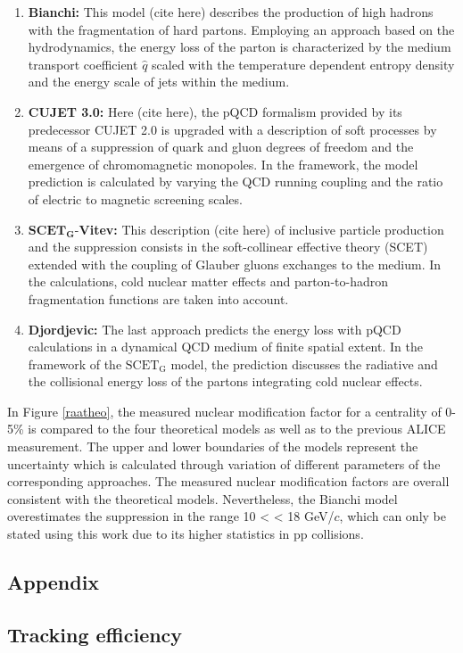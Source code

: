 \documentclass[12pt,a4paper]{report}
\begin{document}
\begin{enumerate}
\item \textbf{Bianchi:} This model (cite here) describes the production of high \pt hadrons with the fragmentation of hard partons. Employing an approach based on the hydrodynamics, the energy loss of the parton is characterized by the medium transport coefficient $\hat q$ scaled with the temperature dependent entropy density and the energy scale of jets within the medium.
\item \textbf{CUJET 3.0:} Here (cite here), the pQCD formalism provided by its predecessor CUJET 2.0 is upgraded with a description of soft processes by means of a suppression of quark and gluon degrees of freedom and the emergence of chromomagnetic monopoles. In the framework, the model prediction is calculated by varying the QCD running coupling and the ratio of electric to magnetic screening scales.
\item $\mathbf{SCET}_\mathbf{G}$-\textbf{Vitev:} This description (cite here) of inclusive particle production and the suppression consists in the soft-collinear effective theory (SCET) extended with the coupling of Glauber gluons exchanges to the medium. In the calculations, cold nuclear matter effects and parton-to-hadron fragmentation functions are taken into account.
\item \textbf{Djordjevic:} The last approach predicts the energy loss with pQCD calculations in a dynamical QCD medium of finite spatial extent. In the framework of the $\text{SCET}_\text{G}$ model, the prediction discusses the radiative and the collisional energy loss of the partons integrating cold nuclear effects.
\end{enumerate}
In Figure \ref{raatheo}, the measured nuclear modification factor for a centrality of 0-5\% is compared to the four theoretical models as well as to the previous ALICE measurement. The upper and lower boundaries of the models represent the uncertainty which is calculated through variation of different parameters of the corresponding approaches. The measured nuclear modification factors are overall consistent with the theoretical models. Nevertheless, the Bianchi model overestimates the suppression in the \pt range 10 < \pt < 18 GeV/$c$, which can only be stated using this work due to its higher statistics in pp collisions.

\begin{appendices}
\chapter{Appendix}
\section{Tracking efficiency}
\label{TrkEffApp}
\end{appendices}
\end{document}
